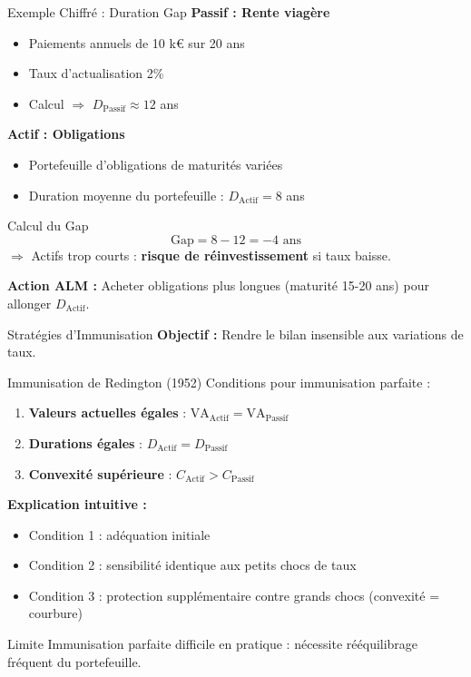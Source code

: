 \documentclass[10pt,aspectratio=169]{beamer}
\begin{document}
\begin{frame}{Exemple Chiffré : Duration Gap}
\textbf{Passif : Rente viagère}
\begin{itemize}
    \item Paiements annuels de 10 k€ sur 20 ans
    \item Taux d'actualisation 2\%
    \item Calcul $\Rightarrow$ $D_{\text{Passif}} \approx 12$ ans
\end{itemize}

\vspace{0.3cm}
\textbf{Actif : Obligations}
\begin{itemize}
    \item Portefeuille d'obligations de maturités variées
    \item Duration moyenne du portefeuille : $D_{\text{Actif}} = 8$ ans
\end{itemize}

\vspace{0.3cm}
\begin{alertblock}{Calcul du Gap}
\[
\text{Gap} = 8 - 12 = -4 \text{ ans}
\]
$\Rightarrow$ Actifs trop courts : \textbf{risque de réinvestissement} si taux baisse.
\end{alertblock}

\textbf{Action ALM :} Acheter obligations plus longues (maturité 15-20 ans) pour allonger $D_{\text{Actif}}$.
\end{frame}

\begin{frame}{Stratégies d'Immunisation}
\textbf{Objectif : } Rendre le bilan insensible aux variations de taux.
\begin{block}{Immunisation de Redington (1952)}
Conditions pour immunisation parfaite :
\begin{enumerate}
    \item \textbf{Valeurs actuelles égales} : $\text{VA}_{\text{Actif}} = \text{VA}_{\text{Passif}}$
    \item \textbf{Durations égales} : $D_{\text{Actif}} = D_{\text{Passif}}$
    \item \textbf{Convexité supérieure} : $C_{\text{Actif}} > C_{\text{Passif}}$
\end{enumerate}
\end{block}

\vspace{0.3cm}
\textbf{Explication intuitive :}
\begin{itemize}
    \item Condition 1 : adéquation initiale
    \item Condition 2 : sensibilité identique aux petits chocs de taux
    \item Condition 3 : protection supplémentaire contre grands chocs (convexité = courbure)
\end{itemize}

\vspace{0.3cm}
\begin{exampleblock}{Limite}
Immunisation parfaite difficile en pratique : nécessite rééquilibrage fréquent du portefeuille.
\end{exampleblock}
\end{frame}
\end{document}
